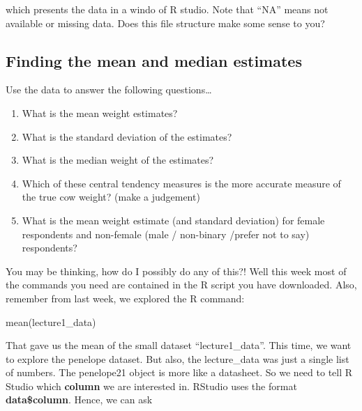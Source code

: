 \documentclass[
]{book}
\newenvironment{Shaded}{\begin{snugshade}}{\end{snugshade}}
\newcommand{\FunctionTok}[1]{\textcolor[rgb]{0.00,0.00,0.00}{#1}}
\newcommand{\NormalTok}[1]{#1}
\newcommand{\SpecialCharTok}[1]{\textcolor[rgb]{0.00,0.00,0.00}{#1}}
\providecommand{\tightlist}{%
  \setlength{\itemsep}{0pt}\setlength{\parskip}{0pt}}
\begin{document}
which presents the data in a windo of R studio. Note that ``NA'' means not available or missing data. Does this file structure make some sense to you?

\hypertarget{finding-the-mean-and-median-estimates}{%
\subsection{Finding the mean and median estimates}\label{finding-the-mean-and-median-estimates}}

Use the data to answer the following questions\ldots{}

\begin{enumerate}
\def\labelenumi{\arabic{enumi}.}
\tightlist
\item
  What is the mean weight estimates?
\item
  What is the standard deviation of the estimates?
\item
  What is the median weight of the estimates?
\item
  Which of these central tendency measures is the more accurate measure of the true cow weight? (make a judgement)
\item
  What is the mean weight estimate (and standard deviation) for female respondents and non-female (male / non-binary /prefer not to say) respondents?
\end{enumerate}

You may be thinking, how do I possibly do any of this?! Well this week most of the commands you need are contained in the R script you have downloaded. Also, remember from last week, we explored the R command:

\begin{Shaded}
\begin{Highlighting}[]
\FunctionTok{mean}\NormalTok{(lecture1\_data)}
\end{Highlighting}
\end{Shaded}

That gave us the mean of the small dataset ``lecture1\_data''. This time, we want to explore the penelope dataset. But also, the lecture\_data was just a single list of numbers. The penelope21 object is more like a datasheet. So we need to tell R Studio which \textbf{column} we are interested in. RStudio uses the format \textbf{data\$column}. Hence, we can ask

\begin{Shaded}
\end{Shaded}
\end{document}
